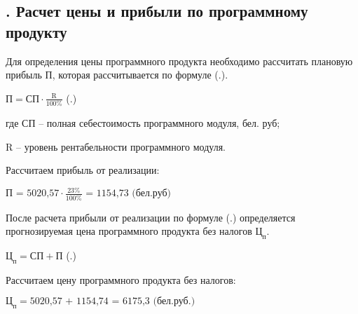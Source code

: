 \subtitlespace

\subsection*{ 
	\gostTitleFont
	\redline
	\thechaptercntr .\thesubchaptercntr \spc
	Расчет цены и прибыли по программному продукту
} \addtocounter{subchaptercntr}{1}

\subtitlespace

{\gostFont

	\par \redline Для определения цены программного продукта необходимо рассчитать плановую прибыль П, которая рассчитывается по формуле (\thechaptercntr .\theformulacntr). 

	\formulaspace \par \redline 
		$\textrm{П} = \textrm{СП} \cdot \frac{\textrm{R}}{\textrm{100\%}}$
	\hfill (\thechaptercntr .\theformulacntr) \redline
	\formulaspace \addtocounter{formulacntr}{1}

	\par \redline где $\textrm{СП}$ {--} полная себестоимость программного модуля, бел. руб; 
	\par \redline \wherespace $\textrm{R}$ {--} уровень рентабельности программного модуля.

	\par \redline Рассчитаем прибыль от реализации:

	\formulaspace \par \redline 
		$\textrm{П = 5020,57} \cdot \frac{\textrm{23\%}}{\textrm{100\%}} \textrm{ = 1154,73 (бел.руб)}$
	\formulaspace

	\par \redline После расчета прибыли от реализации по формуле (\thechaptercntr .\theformulacntr) определяется прогнозируемая цена программного продукта без налогов $\textrm{Ц}_{\textrm{п}}$.

	\formulaspace \par \redline 
		$\textrm{Ц}_{\textrm{п}} = \textrm{СП} + \textrm{П}$
	\hfill (\thechaptercntr .\theformulacntr) \redline
	\formulaspace \addtocounter{formulacntr}{1}

	\par \redline Рассчитаем цену программного продукта без налогов:

	\formulaspace \par \redline 
		$\textrm{Ц}_{\textrm{п}} = \textrm{5020,57 + 1154,74 = 6175,3 (бел.руб.)}$
	\formulaspace

}
